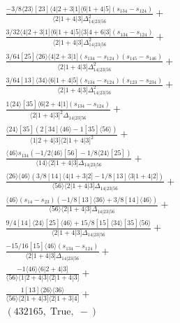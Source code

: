 \documentclass[varwidth, border=5pt]{standalone}
\begin{document}
\begin{my}
$\begin{gathered}
\scriptscriptstyle\frac{-3/8⟨23⟩[23]⟨4|2+3|1]⟨6|1+4|5](s_{134}-s_{124})}{⟨2|1+4|3]Δ_{14|23|56}^2}+\\
\scriptscriptstyle\frac{3/32⟨4|2+3|1]⟨6|1+4|5]⟨3|4+6|3](s_{134}-s_{124})}{⟨2|1+4|3]Δ_{14|23|56}^2}+\\
\scriptscriptstyle\frac{3/64[25]⟨26⟩⟨4|2+3|1](s_{134}-s_{124})(s_{145}-s_{146})}{⟨2|1+4|3]Δ_{14|23|56}^2}+\\
\scriptscriptstyle\frac{3/64[13]⟨34⟩⟨6|1+4|5](s_{134}-s_{124})(s_{123}-s_{234})}{⟨2|1+4|3]Δ_{14|23|56}^2}+\\
\scriptscriptstyle\frac{1⟨24⟩[35]⟨6|2+4|1](s_{134}-s_{124})}{⟨2|1+4|3]^2Δ_{14|23|56}}+\\
\scriptscriptstyle\frac{⟨24⟩[35](2[34]⟨46⟩-1[35]⟨56⟩)}{⟨1|2+4|3]⟨2|1+4|3]^2}+\\
\scriptscriptstyle\frac{⟨46⟩s_{134}(-1/2⟨46⟩[56]-1/8⟨24⟩[25])}{⟨14⟩⟨2|1+4|3]Δ_{14|23|56}}+\\
\scriptscriptstyle\frac{⟨26⟩⟨46⟩(3/8[14]⟨4|1+3|2]-1/8[13]⟨3|1+4|2])}{⟨56⟩⟨2|1+4|3]Δ_{14|23|56}}+\\
\scriptscriptstyle\frac{⟨46⟩(s_{14}-s_{23})(-1/8[13]⟨36⟩+3/8[14]⟨46⟩)}{⟨56⟩⟨2|1+4|3]Δ_{14|23|56}}+\\
\scriptscriptstyle\frac{9/4[14]⟨24⟩[25]⟨46⟩+15/8[15]⟨34⟩[35]⟨56⟩}{⟨2|1+4|3]Δ_{14|23|56}}+\\
\scriptscriptstyle\frac{-15/16[15]⟨46⟩(s_{134}-s_{124})}{⟨2|1+4|3]Δ_{14|23|56}}+\\
\scriptscriptstyle\frac{-1⟨46⟩⟨6|2+4|3]}{⟨56⟩⟨1|2+4|3]⟨2|1+4|3]}+\\
\scriptscriptstyle\frac{1[13]⟨26⟩⟨36⟩}{⟨56⟩⟨2|1+4|3]⟨2|1+3|4]}+\\
\scriptscriptstyle(432165,\;\text{True},\;-)\phantom{+}
\end{gathered}$
\end{my}
\end{document}

